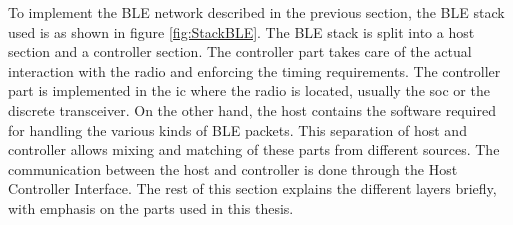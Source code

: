 To implement the BLE network described in the previous section, the BLE stack used is as shown in figure \ref{fig:StackBLE}. The BLE stack is split into a host section and a controller section. The controller part takes care of the actual interaction with the radio and enforcing the timing requirements. The controller part is implemented in the \gls{ic} where the radio is located, usually the \gls{soc} or the discrete transceiver. On the other hand, the host contains the software required for handling the various kinds of BLE packets. This separation of host and controller allows mixing and matching of these parts from different sources. The communication between the host and controller is done through the Host Controller Interface. The rest of this section explains the different layers briefly, with emphasis on the parts used in this thesis.


